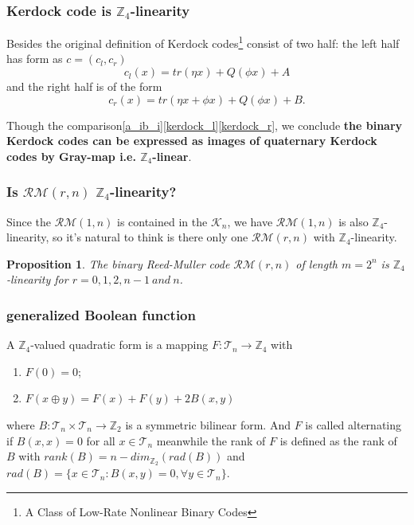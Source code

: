 \documentclass[
    aspectratio=169,                   %
]{beamer}
\renewcommand{\Bbb}{\mathbb}
\newcommand{\Z}{\mathbb{Z}}
\newtheorem{proposition}{Proposition}
\begin{document}
    \begin{frame}
        \frametitle{Kerdock code is $ \Z_4 $-linearity}
    
        Besides the original definition of Kerdock codes\footnote{A Class of Low-Rate Nonlinear Binary Codes} consist of two half: the left half has form as $c=(c_l,c_r)$
    \begin{equation}\label{kerdock_l}
        c_l(x)=tr(\eta x)+Q(\phi x)+A
    \end{equation}
    and the right half is of the form
    \begin{equation}\label{kerdock_r}
        c_r(x)=tr(\eta x+\phi x)+Q(\phi x)+B.
    \end{equation}

    Though the comparison\ref{a_ib_i}\ref{kerdock_l}\ref{kerdock_r}, we conclude \textbf{the binary Kerdock codes can be expressed as images of quaternary Kerdock codes by Gray-map i.e. $\Bbb Z_4$-linear}.
    
    \end{frame}
    \begin{frame}
        \frametitle{Is $\mathcal{RM}(r,n) $ $ \Z_4 $-linearity?}
    
        \begin{remark}
            Since the $ \mathcal{RM}(1,n) $ is contained in the $ \mathcal{K}_n $, we have $ \mathcal{RM}(1,n) $ is also $ \Z_4 $-linearity, so it's natural to think is there only one $ \mathcal{RM}(r,n) $ with $ \Z_4 $-linearity.
        \end{remark}
        \begin{proposition}
        The binary Reed-Muller code $ \mathcal{RM}(r,n) $ of length $ m=2^n $ is $ \Z_4 $-linearity for $ r=0,1,2,n-1~and ~n $.
        \end{proposition}
    
    \end{frame}
    \begin{frame}
        \frametitle{generalized Boolean function}
    
        \begin{definition}[$ \Z_4 $-valued quadratic form]
            A $ \Z_4 $-valued quadratic form is a mapping $ F:\mathcal{T}_n\rightarrow \Z_4 $ with 
            \begin{enumerate} 
                \item $ F(0)=0 $;
                \item $ F(x\oplus y)=F(x)+F(y)+2B(x,y) $
            \end{enumerate}
            where $ B:\mathcal{T}_n\times\mathcal{T}_n\rightarrow \Z_2 $ is a symmetric bilinear form. And $ F $ is called alternating if $ B(x,x)=0 $ for all $ x\in\mathcal{T}_n $ meanwhile the rank of $ F $ is defined as the rank of $ B $ with $ rank(B)=n-dim_{\Z_2}(rad(B)) $ and $ rad(B)=\{x\in\mathcal{T}_n:B(x,y)=0,\forall y\in\mathcal{T}_n\} $.
        \end{definition}
    
    \end{frame}
\end{document}
